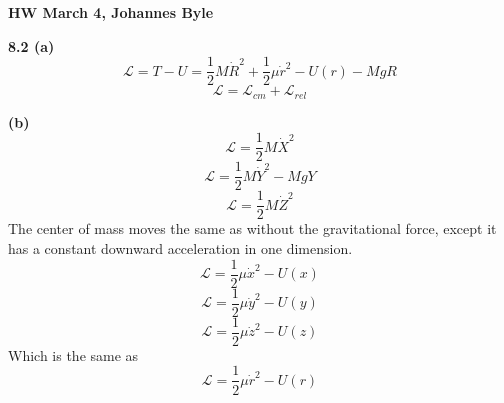 \documentclass[english]{article}
\begin{document}
\begin{multicols*}{2}
\textbf{HW March 4, Johannes Byle}\\
\newcommand{\Lagr}{\mathcal{L}}

\noindent
\textbf{8.2 (a)}
$$\Lagr=T-U=\frac{1}{2}M\dot{R}^2+\frac{1}{2}\mu\dot{r}^2-U(r)-MgR$$
$$\Lagr=\Lagr_{cm}+\Lagr_{rel}$$

\noindent
\textbf{(b)}
$$\Lagr=\frac{1}{2}M\dot{X}^2$$
$$\Lagr=\frac{1}{2}M\dot{Y}^2-MgY$$
$$\Lagr=\frac{1}{2}M\dot{Z}^2$$
The center of mass moves the same as without the gravitational force, except it has a constant downward acceleration in one dimension. 
$$\Lagr=\frac{1}{2}\mu\dot{x}^2-U(x)$$
$$\Lagr=\frac{1}{2}\mu\dot{y}^2-U(y)$$
$$\Lagr=\frac{1}{2}\mu\dot{z}^2-U(z)$$
Which is the same as 
$$\Lagr=\frac{1}{2}\mu\dot{r}^2-U(r)$$
\end{multicols*}
\end{document}
